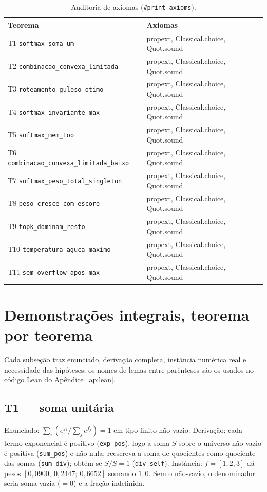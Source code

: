 \documentclass[12pt,openany,oneside,a4paper,brazil,chapter=TITLE]{abntex2}
\begin{document}
\begin{table}[htbp]
\fontsize{10}{12}\selectfont\SingleSpacing
\centering
\caption{Auditoria de axiomas (\texttt{\#print axioms}).}
\label{tab:ax}
\begin{tabularx}{\textwidth}{XX}
\toprule
Teorema & Axiomas \\
\midrule
T1 \texttt{softmax\_soma\_um} & propext, Classical.choice, Quot.sound \\
T2 \nolinkurl{combinacao_convexa_limitada} & propext, Classical.choice, Quot.sound \\
T3 \nolinkurl{roteamento_guloso_otimo} & propext, Classical.choice, Quot.sound \\
T4 \texttt{softmax\_invariante\_max} & propext, Classical.choice, Quot.sound \\
T5 \texttt{softmax\_mem\_Ioo} & propext, Classical.choice, Quot.sound \\
T6 \nolinkurl{combinacao_convexa_limitada_baixo} & propext, Classical.choice, Quot.sound \\
T7 \nolinkurl{softmax_peso_total_singleton} & propext, Classical.choice, Quot.sound \\
T8 \nolinkurl{peso_cresce_com_escore} & propext, Classical.choice, Quot.sound \\
T9 \texttt{topk\_dominam\_resto} & propext, Classical.choice, Quot.sound \\
T10 \nolinkurl{temperatura_aguca_maximo} & propext, Classical.choice, Quot.sound \\
T11 \texttt{sem\_overflow\_apos\_max} & propext, Classical.choice, Quot.sound \\
\bottomrule
\end{tabularx}
\end{table}



\section{Demonstrações integrais, teorema por teorema}
Cada subseção traz enunciado, derivação completa, instância numérica real e necessidade das hipóteses; os nomes de lemas entre parênteses são os usados no código Lean do Apêndice~\ref{ap:lean}.
\subsection{T1 --- soma unitária}
Enunciado: $\sum_i(e^{f_i}/\sum_j e^{f_j})=1$ em tipo finito não vazio. Derivação: cada termo exponencial é positivo (\texttt{exp\_pos}), logo a soma $S$ sobre o universo não vazio é positiva (\texttt{sum\_pos}) e não nula; reescreva a soma de quocientes como quociente das somas (\texttt{sum\_div}); obtém-se $S/S=1$ (\texttt{div\_self}). Instância: $f=[1,2,3]$ dá pesos $[0{,}0900;\ 0{,}2447;\ 0{,}6652]$ somando $1{,}0$. Sem o não-vazio, o denominador seria soma vazia ($=0$) e a fração indefinida.
\end{document}
